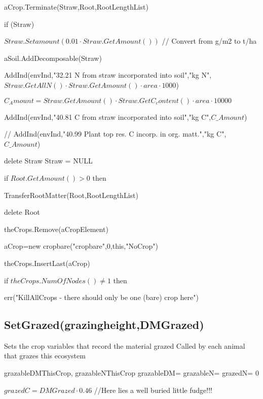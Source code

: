 \documentclass[%
]{scrartcl}
\begin{document}
 aCrop.Terminate(Straw,Root,RootLengthList)
          
  if (Straw)
          
              \quad  $Straw.Setamount(0.01 \cdot Straw.GetAmount())$  // Convert from g/m2 to t/ha
            
 \quad   aSoil.AddDecomposable(Straw)
          
    \quad  AddInd(envInd,"32.21 N from straw incorporated into soil","kg N",
$Straw.GetAllN() \cdot Straw.GetAmount() \cdot area \cdot 1000$)
            
  \quad    $C_Amount = Straw.GetAmount() \cdot Straw.GetC_content() \cdot area \cdot 10000$
            
\quad    AddInd(envInd,"40.81 C from straw incorporated into soil","kg C",$C\_Amount$)
 
\quad //               AddInd(envInd,"40.99 Plant top res. C incorp. in org. matt.","kg C",$C\_Amount$)
              
\quad  delete Straw
              \quad  Straw = NULL
           
            if $Root.GetAmount()>0$ then

            \quad 	 TransferRootMatter(Root,RootLengthList)
          
   \quad  \quad  delete Root
      
      


 \quad  theCrops.Remove(aCropElement)
   


   aCrop=new cropbare("cropbare",0,this,"NoCrop")

   theCrops.InsertLast(aCrop)

   if $theCrops.NumOfNodes()\ne 1$ then

   \quad     err("KillAllCrops - there should only be one (bare) crop here")









\subsection{SetGrazed(grazingheight,DMGrazed)}
Sets the crop variables that record the material grazed
Called by each animal that grazes this ecosystem

     grazableDMThisCrop, grazableNThisCrop
     grazableDM= grazableN= grazedN=  0
     
$grazedC = DMGrazed  \cdot  0.46 $    //Here lies a well buried little fudge!!!
   
\end{document}
